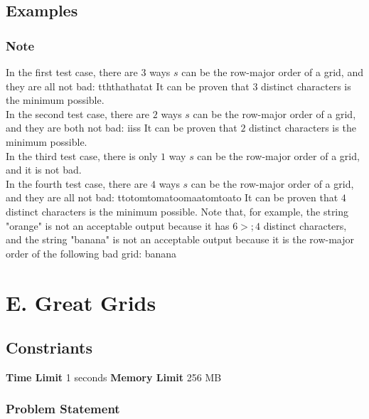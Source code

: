 \documentclass{article}
\begin{document}
\subsection*{Examples}
\subsubsection*{Note}In the first test case, there are $3$ ways $s$ can be the row-major order of a grid, and they are all not bad: tththathatat It can be proven that $3$ distinct characters is the minimum possible.\\ In the second test case, there are $2$ ways $s$ can be the row-major order of a grid, and they are both not bad: iiss It can be proven that $2$ distinct characters is the minimum possible.\\ In the third test case, there is only $1$ way $s$ can be the row-major order of a grid, and it is not bad.\\ In the fourth test case, there are $4$ ways $s$ can be the row-major order of a grid, and they are all not bad: ttotomtomatoomaatomtoato It can be proven that $4$ distinct characters is the minimum possible. Note that, for example, the string "orange" is not an acceptable output because it has $6 >; 4$ distinct characters, and the string "banana" is not an acceptable output because it is the row-major order of the following bad grid: banana
\newpage
\section*{E. Great Grids}
\subsection*{Constriants}
\textbf{Time Limit}
1 seconds
\hfill
\textbf{Memory Limit}
256 MB
\subsubsection*{Problem Statement}
\end{document}
